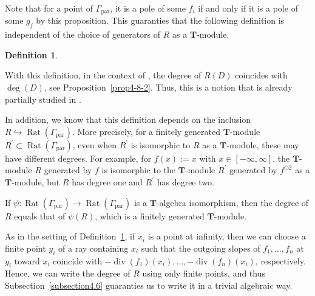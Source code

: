 \documentclass[a4paper,12pt]{amsart}
\newtheorem{dfn}{Definition}[section]
\def\Gamma{\varGamma}
\begin{document}
Note that for a point of $\Gamma_{\operatorname{par}}$, it is a pole of some $f_i$ if and only if it is a pole of some $g_j$ by this proposition.
This guaranties that the following definition is independent of the choice of generators of $R$ as a $\boldsymbol{T}$-module.

\begin{dfn}
    \label{dfn4-7-1}
\end{dfn}

With this definition, in the context of \cite[Theorem~35]{Haase=Musiker=Yu}, the degree of $R(D)$ coincides with $\operatorname{deg}(D)$, see Proposition~\ref{prop4-8-2}.
Thus, this is a notion that is already partially studied in \cite{Haase=Musiker=Yu}.

In addition, we know that this definition depends on the inclusion $R \hookrightarrow \operatorname{Rat}(\Gamma_{\operatorname{par}})$.
More precisely, for a finitely generated $\boldsymbol{T}$-module $R^{\prime} \subset \operatorname{Rat}(\Gamma_{\operatorname{par}})$, even when $R^{\prime}$ is isomorphic to $R$ as a $\boldsymbol{T}$-module, these may have different degrees.
For example, for $f(x) := x$ with $x \in [-\infty, \infty]$, the $\boldsymbol{T}$-module $R$ generated by $f$ is isomorphic to the $\boldsymbol{T}$-module $R^{\prime}$ generated by $f^{\odot 2}$ as a $\boldsymbol{T}$-module, but $R$ has degree one and $R^{\prime}$ has degree two.

If $\psi : \operatorname{Rat}(\Gamma_{\operatorname{par}}) \to \operatorname{Rat}(\Gamma_{\operatorname{par}})$ is a $\boldsymbol{T}$-algebra isomorphism, then the degree of $R$ equals that of $\psi(R)$, which is a finitely generated $\boldsymbol{T}$-module.

As in the setting of Definition~\ref{dfn4-7-1}, if $x_i$ is a point at infinity, then we can choose a finite point $y_i$ of a ray containing $x_i$ such that the outgoing slopes of $f_1, \ldots, f_n$ at $y_i$ toward $x_i$ coincide with $-\operatorname{div}(f_1)(x_i), \ldots, -\operatorname{div}(f_n)(x_i)$, respectively.
Hence, we can write the degree of $R$ using only finite points, and thus Subsection~\ref{subsection4.6} guaranties us to write it in a trivial algebraic way.
\end{document}
